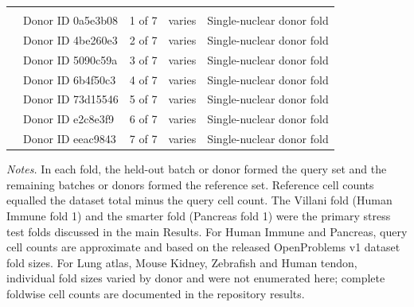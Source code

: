 \documentclass[11pt]{article}
\begin{document}
\begin{table}[htbp]
\begin{tabularx}{\textwidth}{@{}L{0.18\textwidth} L{0.18\textwidth} L{0.10\textwidth} L{0.10\textwidth} Y@{}}
\addlinespace
{} \\
& Donor ID 0a5e3b08 & 1 of 7 & varies & Single-nuclear donor fold \\
& Donor ID 4be260e3 & 2 of 7 & varies & Single-nuclear donor fold \\
& Donor ID 5090c59a & 3 of 7 & varies & Single-nuclear donor fold \\
& Donor ID 6b4f50c3 & 4 of 7 & varies & Single-nuclear donor fold \\
& Donor ID 73d15546 & 5 of 7 & varies & Single-nuclear donor fold \\
& Donor ID e2c8e3f9 & 6 of 7 & varies & Single-nuclear donor fold \\
& Donor ID eeac9843 & 7 of 7 & varies & Single-nuclear donor fold \\
\bottomrule
\end{tabularx}

\vspace{0.5em}
{\raggedright\scriptsize\textit{Notes.} In each fold, the held-out batch or donor formed the query set and the remaining batches or donors formed the reference set. Reference cell counts equalled the dataset total minus the query cell count. The Villani fold (Human Immune fold 1) and the smarter fold (Pancreas fold 1) were the primary stress test folds discussed in the main Results. For Human Immune and Pancreas, query cell counts are approximate and based on the released OpenProblems v1 dataset fold sizes. For Lung atlas, Mouse Kidney, Zebrafish and Human tendon, individual fold sizes varied by donor and were not enumerated here; complete foldwise cell counts are documented in the repository results. \par}
\end{table}

\FloatBarrier
\end{document}
